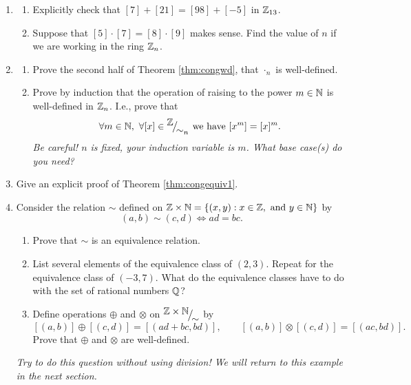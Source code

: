 \begin{exercises}{}{}

\begin{enumerate}
  \item\begin{enumerate}
    \item Explicitly check that $[7]+[21]=[98]+[-5]$ in $\mathbb{Z}_{13}$.
    \item Suppose that $[5]\cdot[7]=[8]\cdot[9]$ makes sense. Find the value of $n$ if we are working in the ring $\mathbb{Z}_n$.
  \end{enumerate}
  
  \item\begin{enumerate}
    \item Prove the second half of Theorem \ref{thm:congwd}, that $\cdot_n$ is well-defined.
	  \item Prove by induction that the operation of raising to the power $m\in\mathbb{N}$ is well-defined in $\mathbb{Z}_n$. I.e., prove that
  \[\forall m\in\mathbb{N},\ \forall [x]\in{}^{\textstyle {\mathbb{Z}}}\!\big/_{\textstyle \!{\sim_n}}\text{ we have } [x^m]=[x]^m.\]
  \emph{Be careful! $n$ is fixed, your induction variable is $m$. What base case(s) do you need?}
  \end{enumerate} 
  
  \item Give an explicit proof of Theorem \ref{thm:congequiv1}.
  
  \item\label{ex:qequiv} Consider the relation $\sim$ defined on $\mathbb{Z}\times\mathbb{N}=\{(x,y):x\in\mathbb{Z},\text{ and }y\in\mathbb{N}\}$ by
  \[(a,b)\sim(c,d)\iff ad=bc.\]
  \begin{enumerate}
    \item Prove that $\sim$ is an equivalence relation.
    \item List several elements of the equivalence class of $(2,3)$. Repeat for the equivalence class of $(-3,7)$. What do the equivalence classes have to do with the set of rational numbers $\mathbb{Q}$?
    \item Define operations $\oplus$ and $\otimes$ on ${}^{\textstyle {\mathbb{Z}\times\mathbb{N}}}\!\big/_{\textstyle \!{\sim}}$ by
    \[[(a,b)]\oplus[(c,d)]=[(ad+bc,bd)],\qquad [(a,b)]\otimes[(c,d)]=[(ac,bd)].\]
    Prove that $\oplus$ and $\otimes$ are well-defined.
  \end{enumerate}
  \emph{Try to do this question \emph{without} using division! We will return to this example in the next section.}
\end{enumerate}

\end{exercises}
\clearpage




